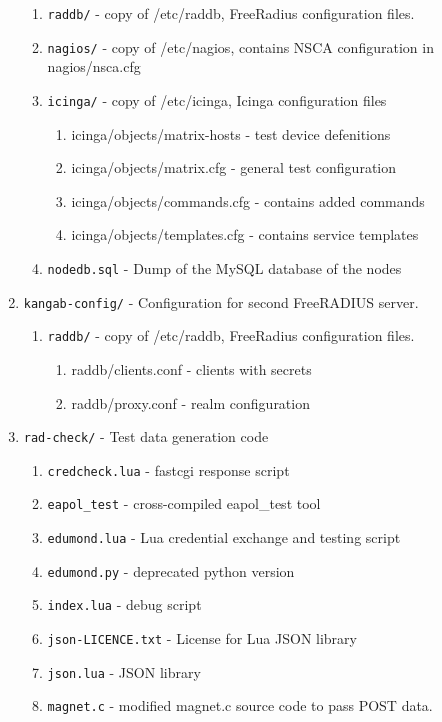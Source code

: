 \begin{enumerate}
\begin{enumerate}
 \item\texttt{raddb/} - copy of /etc/raddb, FreeRadius configuration files.
 \item\texttt{nagios/} - copy of /etc/nagios, contains NSCA configuration in nagios/nsca.cfg
 \item\texttt{icinga/} - copy of /etc/icinga, Icinga configuration files
\begin{enumerate}
                \item icinga/objects/matrix-hosts - test device defenitions
                \item icinga/objects/matrix.cfg - general test configuration
                \item icinga/objects/commands.cfg - contains added commands
                \item icinga/objects/templates.cfg - contains service templates
\end{enumerate}
 \item\texttt{nodedb.sql} - Dump of the MySQL database of the nodes
\end{enumerate}
\item\texttt{kangab-config/} - Configuration for second FreeRADIUS server.
\begin{enumerate}
 \item\texttt{raddb/} - copy of /etc/raddb, FreeRadius configuration files.
\begin{enumerate}
                \item raddb/clients.conf - clients with secrets
                \item raddb/proxy.conf - realm configuration
\end{enumerate}
\end{enumerate}
\item\texttt{rad-check/} - Test data generation code
\begin{enumerate}
 \item\texttt{credcheck.lua} - fastcgi response script
 \item\texttt{eapol\_test} - cross-compiled eapol\_test tool
 \item\texttt{edumond.lua} - Lua credential exchange and testing script
 \item\texttt{edumond.py} - deprecated python version
 \item\texttt{index.lua} - debug script
 \item\texttt{json-LICENCE.txt} - License for Lua JSON library
 \item\texttt{json.lua} - JSON library
 \item\texttt{magnet.c} - modified magnet.c source code to pass POST data.

\end{enumerate}
\end{enumerate}
